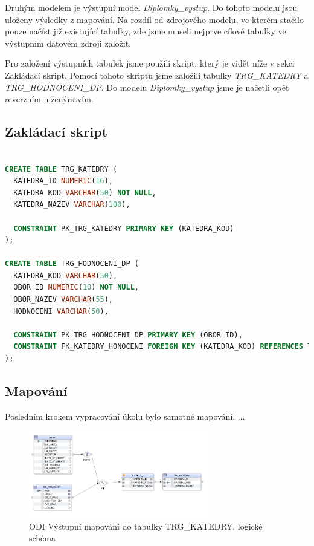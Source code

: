 Druhým modelem je výstupní model \textit{Diplomky\_vystup}. Do tohoto modelu jsou uloženy výsledky z mapování. Na rozdíl od zdrojového modelu, ve kterém stačilo pouze načíst již existující tabulky, zde jsme museli nejprve cílové tabulky ve výstupním datovém zdroji založit.

Pro založení výstupních tabulek jsme použili skript, který je vidět níže v sekci Zakládací skript. Pomocí tohoto skriptu jsme založili tabulky \textit{TRG\_KATEDRY} a \textit{TRG\_HODNOCENI\_DP}. Do modelu \textit{Diplomky\_vystup} jsme je načetli opět reverzním inženýrstvím.  

\subsection{Zakládací skript}
\begin{lstlisting}[language=sql]

CREATE TABLE TRG_KATEDRY (
  KATEDRA_ID NUMERIC(16),
  KATEDRA_KOD VARCHAR(50) NOT NULL,
  KATEDRA_NAZEV VARCHAR(100),

  CONSTRAINT PK_TRG_KATEDRY PRIMARY KEY (KATEDRA_KOD)
);

CREATE TABLE TRG_HODNOCENI_DP (
  KATEDRA_KOD VARCHAR(50),
  OBOR_ID NUMERIC(10) NOT NULL,
  OBOR_NAZEV VARCHAR(55),
  HODNOCENI VARCHAR(50),

  CONSTRAINT PK_TRG_HODNOCENI_DP PRIMARY KEY (OBOR_ID),
  CONSTRAINT FK_KATEDRY_HONOCENI FOREIGN KEY (KATEDRA_KOD) REFERENCES TRG_KATEDRY (KATEDRA_KOD)
);
\end{lstlisting}


 \subsection{Mapování}
 Posledním krokem vypracování úkolu bylo samotné mapování. ....




\begin{figure}[htb]
    \centering
    \includegraphics[width=0.7\textwidth]{graphs/odi-mapping-trg-katedry.png}
    \caption{ODI Výstupní mapování do tabulky TRG\_KATEDRY, logické schéma}
    \label{fig:odi-mapping-trg-katedry}
\end{figure}
\FloatBarrier

